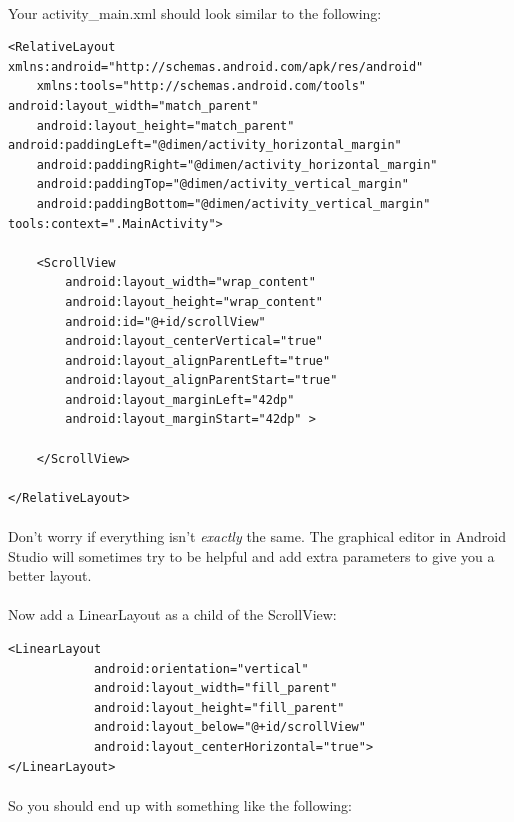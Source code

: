 \paragraph{} Your activity\_main.xml should look similar to the following:

\begin{lstlisting}
<RelativeLayout xmlns:android="http://schemas.android.com/apk/res/android"
    xmlns:tools="http://schemas.android.com/tools" android:layout_width="match_parent"
    android:layout_height="match_parent" android:paddingLeft="@dimen/activity_horizontal_margin"
    android:paddingRight="@dimen/activity_horizontal_margin"
    android:paddingTop="@dimen/activity_vertical_margin"
    android:paddingBottom="@dimen/activity_vertical_margin" tools:context=".MainActivity">

    <ScrollView
        android:layout_width="wrap_content"
        android:layout_height="wrap_content"
        android:id="@+id/scrollView"
        android:layout_centerVertical="true"
        android:layout_alignParentLeft="true"
        android:layout_alignParentStart="true"
        android:layout_marginLeft="42dp"
        android:layout_marginStart="42dp" >
         
    </ScrollView>

</RelativeLayout>
\end{lstlisting}
\paragraph{} Don't worry if everything isn't \emph{exactly} the same. The graphical editor in Android Studio will sometimes try to be helpful and add extra parameters to give you a better layout.

\paragraph{} Now add a LinearLayout as a child of the ScrollView:

\begin{lstlisting}
<LinearLayout
            android:orientation="vertical"
            android:layout_width="fill_parent"
            android:layout_height="fill_parent"
            android:layout_below="@+id/scrollView"
            android:layout_centerHorizontal="true">
</LinearLayout>
\end{lstlisting}

\paragraph{} So you should end up with something like the following:

